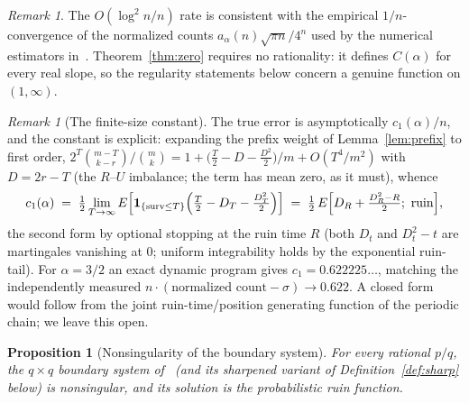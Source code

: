 \documentclass[11pt]{article}
\newtheorem{proposition}[theorem]{Proposition}
\theoremstyle{definition}
\theoremstyle{remark}
\newtheorem{remark}[theorem]{Remark}
\begin{document}
\begin{remark}
The $O(\log^2 n / n)$ rate is consistent with the empirical
$1/n$-convergence of the normalized counts
$a_\alpha(n)\sqrt{\pi n}/4^n$ used by the numerical estimators
in~\cite{bridge}.
Theorem~\ref{thm:zero} requires no rationality: it defines
$C(\alpha)$ for every real slope, so the regularity statements below
concern a genuine function on $(1, \infty)$.
\end{remark}

\begin{remark}[The finite-size constant]\label{rem:finitesize}
The true error is asymptotically $c_1(\alpha)/n$, and the constant is
explicit: expanding the prefix weight of Lemma~\ref{lem:prefix} to
first order,
$2^T\binom{m-T}{k-r}/\binom{m}{k} = 1 + \bigl(\tfrac{T}{2} - D -
\tfrac{D^2}{2}\bigr)/m + O(T^4/m^2)$ with $D = 2r - T$ (the
$R$--$U$ imbalance; the term has mean zero, as it must), whence
\[
c_1(\alpha) \;=\; \tfrac12 \lim_{T \to \infty}
E\Bigl[\mathbf{1}_{\{\text{surv} \leq T\}}
\Bigl(\tfrac{T}{2} - D_T - \tfrac{D_T^2}{2}\Bigr)\Bigr]
\;=\; \tfrac12\,E\Bigl[D_R + \tfrac{D_R^2 - R}{2};\ \text{ruin}\Bigr],
\]
the second form by optional stopping at the ruin time $R$ (both
$D_t$ and $D_t^2 - t$ are martingales vanishing at $0$; uniform
integrability holds by the exponential ruin-tail).
For $\alpha = 3/2$ an exact dynamic program gives
$c_1 = 0.622225\ldots$, matching the independently measured
$n\cdot(\text{normalized count} - \sigma) \to 0.622$.
A closed form would follow from the joint ruin-time/position
generating function of the periodic chain; we leave this open.
\end{remark}

\begin{proposition}[Nonsingularity of the boundary system]
\label{prop:nonsing}
For every rational $p/q$, the $q \times q$ boundary system
of~\cite{bridge} (and its sharpened variant of
Definition~\ref{def:sharp} below) is nonsingular, and its solution is
the probabilistic ruin function.
\end{proposition}
\end{document}
